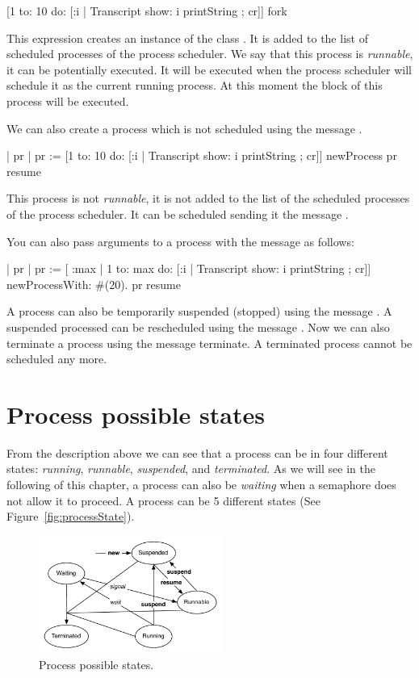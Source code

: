 \documentclass[a4paper,10pt,twoside]{book}
\begin{document}
\begin{code}{}
[1 to: 10 do: [:i | Transcript show: i  printString ; cr]] fork
\end{code}

This expression creates an instance of the class . It is added to the list of scheduled processes of the process scheduler. We say that this process is \emph{runnable}, it can be potentially executed. It will be executed when the process scheduler will schedule it as the current running process. At this moment the block of this process will be executed. 


We can also create a process which is not scheduled using the message . 

\begin{code}{}
| pr | 
pr := [1 to: 10 do: [:i | Transcript show: i  printString ; cr]] newProcess
pr resume
\end{code}

This process is not \emph{runnable}, it is not added to the list of the scheduled processes of the process scheduler. It can be scheduled sending it the message . 

You can also pass arguments to a process with the message  as follows: 

\begin{code}{}
| pr | 
pr := [ :max |
		1 to: max do: [:i | Transcript show: i  printString ; cr]] newProcessWith: #(20).
pr resume
\end{code}



A process can also be temporarily suspended (\ie stopped) using the message . A suspended processed can be rescheduled using the message . Now we can also terminate a process using the message terminate. 
A terminated process cannot be scheduled any more. 

\section{Process possible states}
From the description above we can see that a process can be in four different states: \emph{running}, \emph{runnable}, \emph{suspended}, and \emph{terminated}. As we will see in the following of this chapter, a process can also be \emph{waiting} when a semaphore does not allow it to proceed. A process can be 5 different states (See Figure~\ref{fig:processState}).

\begin{figure}
\begin{center}
\includegraphics[width=6cm]{ProcessState}
\caption{Process possible states.}
\end{center}
\end{figure}
\end{document}
